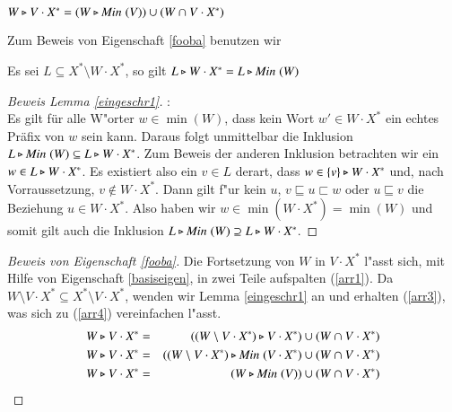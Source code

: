 \begin{eigen}\label{fooba}
$W\triangleright V\cdot X^* = (W\triangleright\mathit{Min}\;(V)) \cup (W\cap V\cdot X^*)$
\end{eigen}
Zum Beweis von Eigenschaft \ref{fooba} benutzen wir

\vspace{2ex}

\begin{lem}\label{eingeschr1}
Es sei $L\subseteq X^*\setminus W\cdot X^*$, so gilt $L\triangleright W\cdot X^* = L\triangleright \mathit{Min}\;(W) $
\end{lem}
\begin{proof}[Beweis Lemma \ref{eingeschr1}]:\\
Es gilt für alle W"orter $w\in\min(W)$, dass kein Wort $w'\in W\cdot X^*$ ein echtes Präfix von $w$ sein kann.
Daraus folgt unmittelbar die Inklusion $L\triangleright \mathit{Min}\;(W) \subseteq L\triangleright W\cdot X^*$.
Zum Beweis der anderen Inklusion betrachten wir ein $w\in L\triangleright W\cdot X^*$. Es existiert also ein $v\in L$ derart, dass $w\in \{v\}\triangleright W\cdot X^*$ und, nach Vorraussetzung, $v\notin W\cdot X^*$. Dann gilt f"ur kein $u$, $v\sqsubseteq u\sqsubset w$ oder $u\sqsubseteq v$ die Beziehung $u\in W\cdot X^*$.
Also haben wir $w\in\min(W\cdot X^*) = \min(W)$ und somit gilt auch die Inklusion $L\triangleright \mathit{Min}\;(W) \supseteq L\triangleright W\cdot X^*$.
\end{proof}

\begin{proof}[Beweis von Eigenschaft \ref{fooba}]
Die Fortsetzung von $W$ in $V\cdot X^*$ l"asst sich, mit Hilfe von Eigenschaft \ref{basiseigen}, in zwei Teile aufspalten (\ref{arr1}).
Da $W\setminus V\cdot X^* \subseteq X^*\setminus V\cdot X^*$, wenden wir Lemma \ref{eingeschr1} an und erhalten (\ref{arr3}), was sich zu (\ref{arr4}) vereinfachen l"asst.
\setcounter{equation}{0}
\begin{eqnarray}
W\triangleright V\cdot X^* & = & ((W\setminus V\cdot X^*) \triangleright V\cdot X^*) \cup (W\cap V\cdot X^*) \label{arr1}\\
W\triangleright V\cdot X^* & = & ((W\setminus V\cdot X^*)  \triangleright \mathit{Min}\;(V\cdot X^*) \cup (W\cap V\cdot X^*) \label{arr3} \\
W\triangleright V\cdot X^* & = &(W \triangleright \mathit{Min}\;(V)) \cup (W\cap V\cdot X^*) \label{arr4}
\end{eqnarray}
\end{proof}






